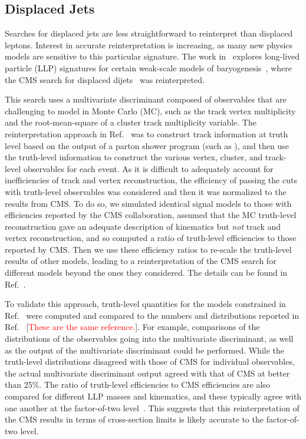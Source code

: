 \subsection{Displaced Jets}
\label{displacedJets}

Searches for displaced jets are less straightforward to reinterpret than
displaced leptons. Interest in accurate reinterpretation is increasing, as many
new physics models are sensitive to this particular signature. The work
in~\cite{Cui:2014twa} explores long-lived particle (LLP) signatures for certain
weak-scale models of baryogenesis~\cite{Cui:2012jh,Cui:2013bta,Cui:2014twa},
where the CMS search for displaced dijets~\cite{CMS-PAS-EXO-12-038} was
reinterpreted.

This search uses a multivariate discriminant composed of observables that are
challenging to model in Monte Carlo (MC), such as the track vertex multiplicity
and the root-mean-square of a cluster track multiplicity variable. The
reinterpretation approach in Ref.~\cite{Cui:2014twa} was to construct track
information at truth level based on the output of a parton shower program (such
as {}), and then use the truth-level information to construct the
various vertex, cluster, and track-level observables for each event. As it is
difficult to adequately account for inefficiencies of track and vertex
reconstruction, the efficiency of passing the cuts with truth-level observables
was considered and then it was normalized to the results from CMS. To do so, we
simulated identical signal models to those with efficiencies reported by the CMS
collaboration, assumed that the MC truth-level reconstruction gave an adequate
description of kinematics but \emph{not} track and vertex reconstruction, and so
computed a ratio of truth-level efficiencies to those reported by CMS. Then we
use these efficiency ratios to re-scale the truth-level results of other models,
leading to a reinterpretation of the CMS search for different models beyond the
ones they considered. The details can be found in Ref.~\cite{Cui:2014twa}.

To validate this approach, truth-level quantities for the models constrained in
Ref.~\cite{CMS-PAS-EXO-12-038} were computed and compared to the numbers and
distributions reported in Ref.~\cite{CMS-PAS-EXO-12-038} [\textcolor{red}{These are the same reference.}]. For example,
comparisons of the distributions of the observables going into the multivariate
discriminant, as well as the output of the multivariate discriminant could be
performed. While the truth-level distributions disagreed with those of CMS for
individual observables, the actual multivariate discriminant output agreed with
that of CMS at better than 25\%. The ratio of truth-level efficiencies to CMS
efficiencies are also compared for different LLP masses and kinematics, and
these typically agree with one another at the factor-of-two
level~\cite{Cui:2014twa}. This suggests that this reinterpretation of the CMS
results in terms of cross-section limits is likely accurate to the factor-of-two level.

